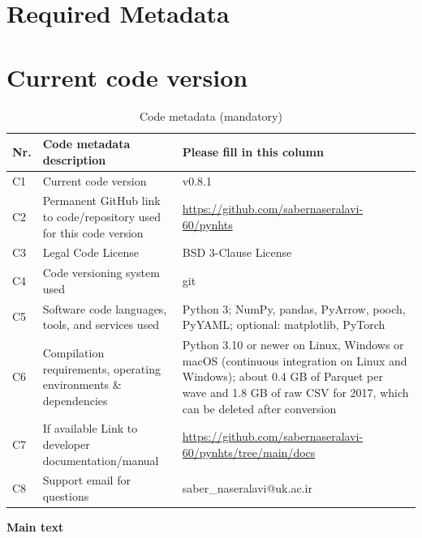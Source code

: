 \documentclass[preprint,12pt, a4paper]{elsarticle}
\begin{document}

\section*{Required Metadata}

\section*{Current code version}

\begin{table}[!h]
\begin{tabular}{|l|p{6.5cm}|p{6.5cm}|}
\hline
\textbf{Nr.} & \textbf{Code metadata description} & \textbf{Please fill in this column} \\
\hline
C1 & Current code version & v0.8.1 \\
\hline
C2 & Permanent GitHub link to code/repository used for this code version & \url{https://github.com/sabernaseralavi-60/pynhts} \\
\hline
C3 & Legal Code License & BSD 3-Clause License \\
\hline
C4 & Code versioning system used & git \\
\hline
C5 & Software code languages, tools, and services used & Python 3; NumPy, pandas, PyArrow, pooch, PyYAML; optional: matplotlib, PyTorch \\
\hline
C6 & Compilation requirements, operating environments \& dependencies & Python 3.10 or newer on Linux, Windows or macOS (continuous integration on Linux and Windows); about 0.4 GB of Parquet per wave and 1.8 GB of raw CSV for 2017, which can be deleted after conversion \\
\hline
C7 & If available Link to developer documentation/manual & \url{https://github.com/sabernaseralavi-60/pynhts/tree/main/docs} \\
\hline
C8 & Support email for questions & saber\_naseralavi@uk.ac.ir \\
\hline
\end{tabular}
\caption{Code metadata (mandatory)}
\label{tab:meta}
\end{table}

\textbf{Main text}\\
\end{document}
